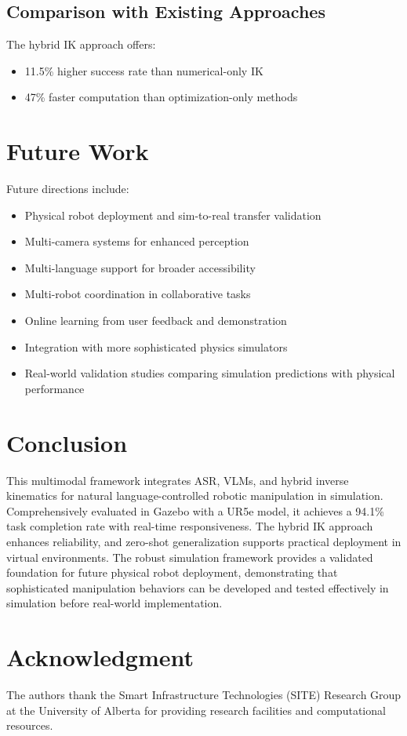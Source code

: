 \documentclass[conference]{IEEEtran}
\begin{document}
\subsection{Comparison with Existing Approaches}
The hybrid IK approach offers:
\begin{itemize}
    \item 11.5\% higher success rate than numerical-only IK
    \item 47\% faster computation than optimization-only methods
\end{itemize}

\section{Future Work}
Future directions include:
\begin{itemize}
    \item Physical robot deployment and sim-to-real transfer validation
    \item Multi-camera systems for enhanced perception
    \item Multi-language support for broader accessibility
    \item Multi-robot coordination in collaborative tasks
    \item Online learning from user feedback and demonstration
    \item Integration with more sophisticated physics simulators
    \item Real-world validation studies comparing simulation predictions with physical performance
\end{itemize}

\section{Conclusion}
This multimodal framework integrates ASR, VLMs, and hybrid inverse kinematics for natural language-controlled robotic manipulation in simulation. Comprehensively evaluated in Gazebo with a UR5e model, it achieves a 94.1\% task completion rate with real-time responsiveness. The hybrid IK approach enhances reliability, and zero-shot generalization supports practical deployment in virtual environments. The robust simulation framework provides a validated foundation for future physical robot deployment, demonstrating that sophisticated manipulation behaviors can be developed and tested effectively in simulation before real-world implementation.

\section*{Acknowledgment}
The authors thank the Smart Infrastructure Technologies (SITE) Research Group at the University of Alberta for providing research facilities and computational resources. 
\end{document}
